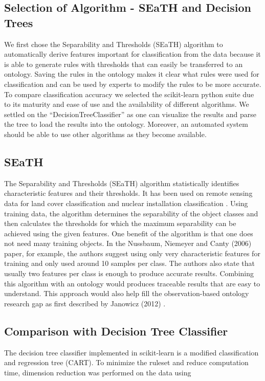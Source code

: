 \documentclass[authoryear, review,12pt,number]{elsarticle}
\begin{document}
\subsection{Selection of Algorithm - SEaTH and Decision Trees}
We first chose the Separability and Thresholds
(SEaTH) \citep{Nussbaum2006} algorithm to automatically derive features important
for classification from the data because it is able to generate rules with
thresholds that can easily be transferred to an ontology. Saving the rules in
the ontology makes it clear what rules were used for classification and can be
used by experts to modify the rules to be more accurate. To compare
classification accuracy we selected the scikit-learn python suite
\citep{scikit-learn} due to its maturity and ease of use and the availability of
different algorithms. We settled on the ``DecisionTreeClassifier'' as one can
visualize the results and parse the tree to load the results into the ontology.
Moreover, an automated system should be able to use other algorithms as they become available.

\subsection{SEaTH} The Separability and Thresholds (SEaTH) algorithm
\citep{Nussbaum2006} statistically identifies characteristic features and their thresholds. It has
been used on remote sensing data for land cover classification \citep{Gao2011}
and nuclear installation classification \citep{Nussbaum2006}.
Using training data, the algorithm determines the separability of the object
classes and then calculates the thresholds for which the maximum separability
can be achieved using the given features. One benefit of the algorithm is that
one does not need many training objects.
In the Nussbaum, Niemeyer and Canty (2006) paper, for example, the authors
suggest using only very characteristic features for training and only used
around 10 samples per class\citep{Nussbaum2006}. The authors also state that
usually two features per class is enough to produce accurate results. Combining
this algorithm with an ontology would produces traceable results that are easy
to understand. This approach would also help fill the observation-based ontology
research gap as first described by Janowicz (2012) \citep{Janowicz2012}.

\subsection{Comparison with Decision Tree Classifier}
The decision tree classifier implemented in scikit-learn is a modified
classification and regression tree (CART)\citep{scikit-learn}. To minimize the
ruleset and reduce computation time, dimension reduction was performed on the
data using
\end{document}
